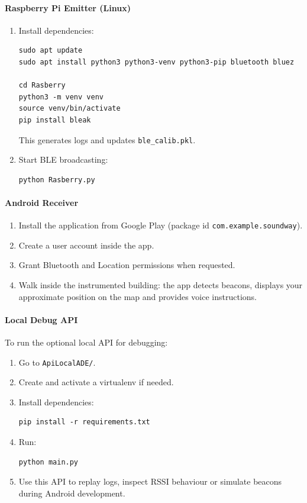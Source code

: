 \documentclass[12pt,a4paper]{article}
\begin{document}
\paragraph{Raspberry Pi Emitter (Linux)}

\begin{enumerate}
    \item Install dependencies:
    \begin{verbatim}
sudo apt update
sudo apt install python3 python3-venv python3-pip bluetooth bluez

cd Rasberry
python3 -m venv venv
source venv/bin/activate
pip install bleak
    \end{verbatim}

    This generates logs and updates \texttt{ble\_calib.pkl}.

    \item Start BLE broadcasting:
    \begin{verbatim}
python Rasberry.py
    \end{verbatim}
\end{enumerate}
\newpage

\paragraph{Android Receiver}

\begin{enumerate}
    \item Install the application from Google Play (package id \texttt{com.example.soundway}).
    \item Create a user account inside the app.
    \item Grant Bluetooth and Location permissions when requested.
    \item Walk inside the instrumented building: the app detects beacons, displays your approximate position on the map and provides voice instructions.
\end{enumerate}

\paragraph{Local Debug API}

To run the optional local API for debugging:

\begin{enumerate}
    \item Go to \texttt{ApiLocalADE/}.
    \item Create and activate a virtualenv if needed.
    \item Install dependencies:
    \begin{verbatim}
pip install -r requirements.txt
    \end{verbatim}
    \item Run:
    \begin{verbatim}
python main.py
    \end{verbatim}
    \item Use this API to replay logs, inspect RSSI behaviour or simulate beacons during Android development.
\end{enumerate}
\end{document}
